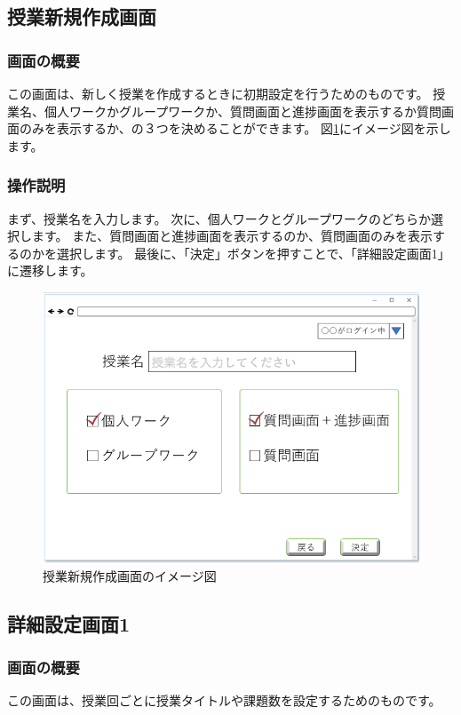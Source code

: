 \newpage

\subsection{授業新規作成画面}
\subsubsection{画面の概要}
この画面は、新しく授業を作成するときに初期設定を行うためのものです。
授業名、個人ワークかグループワークか、質問画面と進捗画面を表示するか質問画面のみを表示するか、の３つを決めることができます。
図\ref{fig:10}にイメージ図を示します。

\subsubsection{操作説明}
まず、授業名を入力します。
次に、個人ワークとグループワークのどちらか選択します。
また、質問画面と進捗画面を表示するのか、質問画面のみを表示するのかを選択します。
最後に、「決定」ボタンを押すことで、「詳細設定画面1」に遷移します。

\begin{figure}[htbp]
  \begin{center}
    \includegraphics[width=0.7\linewidth,clip]{./img/10.png}
    \caption{授業新規作成画面のイメージ図}\label{fig:10}
  \end{center}
\end{figure}

\newpage

\subsection{詳細設定画面1}
\subsubsection{画面の概要}
この画面は、授業回ごとに授業タイトルや課題数を設定するためのものです。


